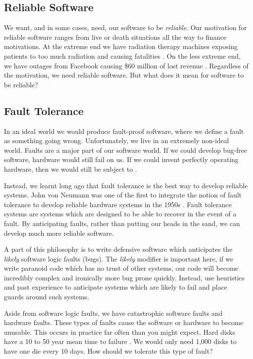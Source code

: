 \subsection{Reliable Software}
We want, and in some cases, need, our software to be \textsl{reliable}.
Our motivation for reliable software ranges from live or death situations all the way to finance motivations.
At the extreme end we have radiation therapy machines exposing patients to too much radiation and causing fatalities \cite{therac}.
On the less extreme end,
we have outages from Facebook causing \$60 million of lost revenue \cite{facebook-outage}.
Regardless of the motivation,
we need reliable software.
But what does it mean for software to be reliable?

\subsection{Fault Tolerance}
In an ideal world we would produce fault-proof software,
where we define a fault as something going wrong.
Unfortunately, we live in an extremely non-ideal world.
Faults are a major part of our software world.
If we could develop bug-free software,
hardware would still fail on us.
If we could invent perfectly operating hardware,
then we would still be subject to .

Instead, we learnt long ago that fault tolerance is the best way to develop reliable systems.
John von Neumann was one of the first to integrate the notion of fault tolerance to develop reliable hardware systems in the 1950s \cite{neumann-faults}.
Fault tolerance systems are systems which are designed to be able to recover in the event of a fault.
By anticipating faults, rather than putting our heads in the sand,
we can develop much more reliable software.

A part of this philosophy is to write defensive software which anticipates the \textsl{likely} software logic faults (bugs).
The \textsl{likely} modifier is important here,
if we write paranoid code which has no trust of other systems,
our code will become incredibly complex and ironically more bug prone quickly.
Instead, use heuristics and past experience to anticipate systems which are likely to fail and place guards around such systems.

Aside from software logic faults,
we have catastrophic software faults and hardware faults.
These types of faults cause the software or hardware to become unusable.
This occurs in practice far often than you might expect.
Hard disks have a 10 to 50 year mean time to failure \cite{data-intensive}.
We would only need 1,000 disks to have one die every 10 days.
How should we tolerate this type of fault?

